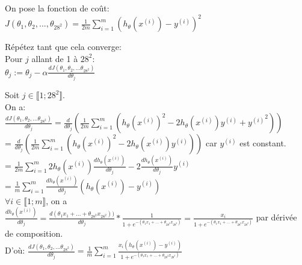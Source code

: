 \documentclass{beamer}
\begin{document}
	\vspace{0.3cm}On pose la fonction de coût: $J(\theta_1, \theta_2, ..., \theta_{28^2}) = \frac{1}{2m}\sum_{i=1}^{m}(h_\theta(x^{(i)}) - y^{(i)})^2$
	
	\vspace{0.3cm}Répétez tant que cela converge:\\
	Pour $j$ allant de 1 à $28^2$:\\
	$\theta_j := \theta_j - \alpha\frac{dJ(\theta_1, \theta_2, ... \theta_{28^2})}{d\theta_j}$%
	
	\newpage
	
	Soit $j \in \llbracket 1; 28^2 \rrbracket$.\\
	On a:\\
	$\frac{dJ(\theta_1, \theta_2, ... \theta_{28^2})}{d\theta_j} = \frac{d}{d\theta_j}(\frac{1}{2m}\sum_{i=1}^{m}(h_\theta(x^{(i)})^2 - 2 h_\theta(x^{(i)}) y^{(i)} + {y^{(i)}}^2))$\\
	= $\frac{d}{d\theta_j}(\frac{1}{2m}\sum_{i=1}^{m}(h_\theta(x^{(i)})^2 - 2 h_\theta(x^{(i)}) y^{(i)}))$ car $y^{(i)}$ est constant.\\
	= $\frac{1}{2m}\sum_{i=1}^{m}2h_\theta(x^{(i)})\frac{dh_\theta(x^{(i)})}{d\theta_j} - 2 \frac{dh_\theta(x^{(i)})}{d\theta_j} y^{(i)}$\\
	= $\frac{1}{m}\sum_{i=1}^{m}\frac{dh_\theta(x^{(i)})}{d\theta_j}(h_\theta(x^{(i)}) - y^{(i)})$\\
	
	\vspace{0.3cm}$\forall i \in \llbracket 1; m \rrbracket$, on a $\frac{dh_\theta(x^{(i)})}{d\theta_j} = \frac{d(\theta_1 x_1 + ... + \theta_{28^2} x_{28^2}))}{d\theta_j} * \frac{1}{1+e^{-(\theta_1 x_1 + ... + \theta_{28^2} x_{28^2})}} = \frac{x_i}{1 + e^{-(\theta_1 x_1 + ... + \theta_{28^2} x_{28^2})}}$ par dérivée de composition.\\
	
	\vspace{0.3cm}D'où: $\frac{dJ(\theta_1, \theta_2, ... \theta_{28^2})}{d\theta_j} = \frac{1}{m}\sum_{i=1}^{m} \frac{x_i (h_\theta(x^{(i)}) - y^{(i)})}{1 + e^{-(\theta_1 x_1 + ... + \theta_{28^2} x_{28^2})}}$

	\newpage
\end{document}
